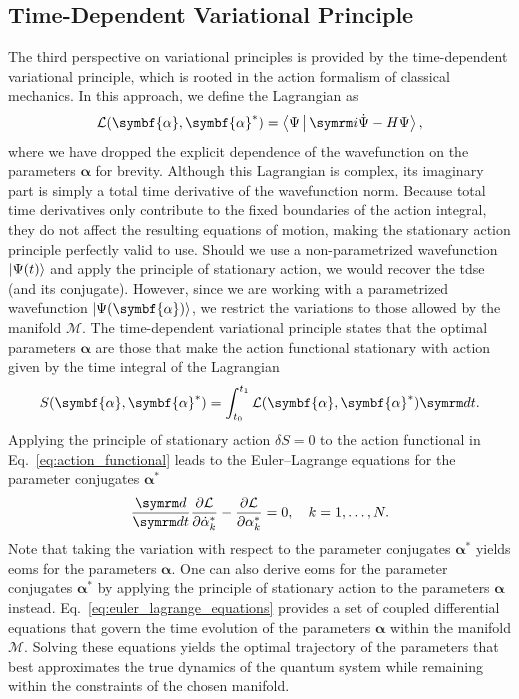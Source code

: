 \subsection{Time-Dependent Variational Principle}\label{sec:time_dependent_variational_principle}
The third perspective on variational principles is provided by the time-dependent variational principle, which is rooted in the action formalism of classical mechanics. In this approach, we define the Lagrangian as\supercite{10.1088/1742-6596/99/1/012009,7550989}
\begin{equation}\label{eq:dirac_lagrangian}
\mathcal{L}(\symbf{\alpha},\symbf{\alpha}^\ast)=\Braket{\Psi|\i\dot\Psi-H\Psi},
\end{equation}
where we have dropped the explicit dependence of the wavefunction on the parameters $\symbf{\alpha}$ for brevity. Although this Lagrangian is complex, its imaginary part is simply a total time derivative of the wavefunction norm. Because total time derivatives only contribute to the fixed boundaries of the action integral, they do not affect the resulting equations of motion, making the stationary action principle perfectly valid to use. Should we use a non-parametrized wavefunction $\ket{\Psi(t)}$ and apply the principle of stationary action, we would recover the \gls{tdse} (and its conjugate). However, since we are working with a parametrized wavefunction $\ket{\Psi(\symbf{\alpha})}$, we restrict the variations to those allowed by the manifold $\mathcal{M}$. The time-dependent variational principle states that the optimal parameters $\symbf{\alpha}$ are those that make the action functional stationary with action given by the time integral of the Lagrangian
\begin{equation}\label{eq:action_functional}
S(\symbf{\alpha},\symbf{\alpha}^\ast)=\int_{t_0}^{t_1}\mathcal{L}(\symbf{\alpha},\symbf{\alpha}^\ast)\dt.
\end{equation}
Applying the principle of stationary action $\delta S=0$ to the action functional in Eq.~\eqref{eq:action_functional} leads to the Euler--Lagrange equations for the parameter conjugates $\symbf{\alpha}^\ast$
\begin{equation}\label{eq:euler_lagrange_equations}
\ddt\frac{\partial\mathcal{L}}{\partial\dot{\alpha}_k^\ast}-\frac{\partial\mathcal{L}}{\partial\alpha_k^\ast}=0,\quad k=1,\ldots,N.
\end{equation}
Note that taking the variation with respect to the parameter conjugates $\symbf{\alpha}^\ast$ yields \glspl{eom} for the parameters $\symbf{\alpha}$. One can also derive \glspl{eom} for the parameter conjugates $\symbf{\alpha}^\ast$ by applying the principle of stationary action to the parameters $\symbf{\alpha}$ instead. Eq.~\eqref{eq:euler_lagrange_equations} provides a set of coupled differential equations that govern the time evolution of the parameters $\symbf{\alpha}$ within the manifold $\mathcal{M}$. Solving these equations yields the optimal trajectory of the parameters that best approximates the true dynamics of the quantum system while remaining within the constraints of the chosen manifold.

